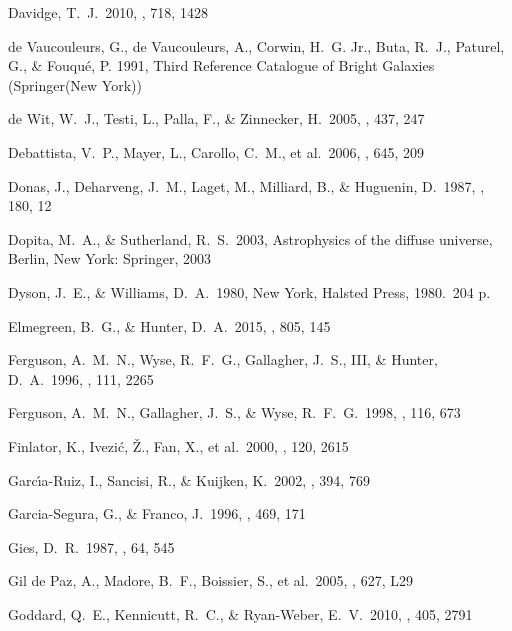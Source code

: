  Davidge, T.~J.\ 2010, \apj, 718, 1428 


 de Vaucouleurs, G., de Vaucouleurs, A., Corwin, H.~G. Jr., Buta,
 R.~J., Paturel, G., \& Fouqu\'e, P. 1991, Third Reference Catalogue
 of Bright Galaxies (Springer(New York))

 de Wit, W.~J., Testi, L., Palla, F., \& Zinnecker, H.\ 2005, \aap, 437, 247 

 Debattista, V.~P., Mayer, L., Carollo, C.~M., et al.\ 2006, \apj, 645, 209 

 Donas, J., Deharveng, J.~M., Laget, M., Milliard, B., \& Huguenin, D.\ 1987, \aap, 180, 12 

 Dopita, M.~A., \& Sutherland, R.~S.\ 2003, Astrophysics of the diffuse universe, Berlin, New York: Springer, 2003

 Dyson, J.~E., \& Williams, D.~A.\ 1980, New York, Halsted Press, 1980.~204 p.


 Elmegreen, B.~G., \& Hunter, D.~A.\ 2015, \apj, 805, 145 


 Ferguson, A.~M.~N., Wyse, R.~F.~G., Gallagher, J.~S., III, \& Hunter, D.~A.\ 1996, \aj, 111, 2265 


 Ferguson, A.~M.~N., Gallagher, J.~S., \& Wyse, R.~F.~G.\ 1998, \aj, 116, 673 


 Finlator, K., Ivezi{\'c}, {\v Z}., Fan, X., et al.\ 2000, \aj, 120, 2615 


 Garc{\'{\i}}a-Ruiz, I., Sancisi, R., \& Kuijken, K.\ 2002, \aap, 394, 769 

 Garcia-Segura, G., \& Franco, J.\ 1996, \apj, 469, 171 

 Gies, D.~R.\ 1987, \apjs, 64, 545 

 Gil de Paz, A., Madore, B.~F., Boissier, S., et al.\ 2005, \apjl, 627, L29 


 Goddard, Q.~E., Kennicutt, R.~C., \& Ryan-Weber, E.~V.\ 2010, \mnras, 405, 2791 


